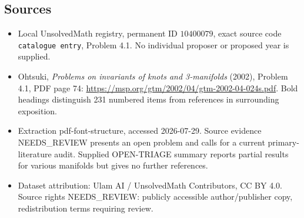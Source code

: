 \documentclass[11pt]{article}
\begin{document}
\subsection{Sources}
\begin{itemize}
\item Local UnsolvedMath registry, permanent ID \(10400079\), exact source code \texttt{catalogue entry}, Problem 4.1. No individual proposer or proposed year is supplied.
\item Ohtsuki, \emph{Problems on invariants of knots and 3-manifolds} (2002), Problem 4.1, PDF page 74: \url{https://msp.org/gtm/2002/04/gtm-2002-04-024s.pdf}. Bold headings distinguish 231 numbered items from references in surrounding exposition.
\item Extraction pdf-font-structure, accessed 2026-07-29. Source evidence NEEDS\_REVIEW presents an open problem and calls for a current primary-literature audit. Supplied OPEN-TRIAGE summary reports partial results for various manifolds but gives no further references.
\item Dataset attribution: Ulam AI / UnsolvedMath Contributors, CC BY 4.0. Source rights NEEDS\_REVIEW: publicly accessible author/publisher copy, redistribution terms requiring review.
\end{itemize}
\end{document}
